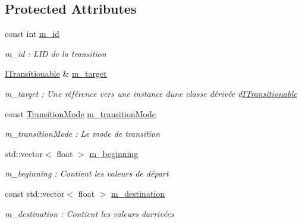\subsection*{Protected Attributes}
\begin{DoxyCompactItemize}
\item 
const int \hyperlink{classns_transition_1_1_transition_contract_a48e1b58bc26cb8b6167fb6b76911c941}{m\+\_\+id}
\begin{DoxyCompactList}\small\item\em m\+\_\+id \+: L\textquotesingle{}ID de la transition \end{DoxyCompactList}\item 
\hyperlink{classns_transition_1_1_i_transitionable}{I\+Transitionable} \& \hyperlink{classns_transition_1_1_transition_contract_a1066c3c1526a519276b75a4f4c5206b2}{m\+\_\+target}
\begin{DoxyCompactList}\small\item\em m\+\_\+target \+: Une référence vers une instance d\textquotesingle{}une classe dérivée d\textquotesingle{}\hyperlink{classns_transition_1_1_i_transitionable}{I\+Transitionable} \end{DoxyCompactList}\item 
const \hyperlink{classns_transition_1_1_transition_contract_a40118ebf3c1a0a486934ce2b9ddc3edb}{Transition\+Mode} \hyperlink{classns_transition_1_1_transition_contract_a9634edf746d8605e78ae30f7a0e6efd3}{m\+\_\+transition\+Mode}
\begin{DoxyCompactList}\small\item\em m\+\_\+transition\+Mode \+: Le mode de transition \end{DoxyCompactList}\item 
std\+::vector$<$ float $>$ \hyperlink{classns_transition_1_1_transition_contract_a5f804f0f4cc00d48e139ff93c5469954}{m\+\_\+beginning}
\begin{DoxyCompactList}\small\item\em m\+\_\+beginning \+: Contient les valeurs de départ \end{DoxyCompactList}\item 
const std\+::vector$<$ float $>$ \hyperlink{classns_transition_1_1_transition_contract_adc660e53bde2e552bb4148ac7abc4e42}{m\+\_\+destination}
\begin{DoxyCompactList}\small\item\em m\+\_\+destination \+: Contient les valeurs d\textquotesingle{}arrivées \end{DoxyCompactList}\item 

\end{DoxyCompactItemize}
